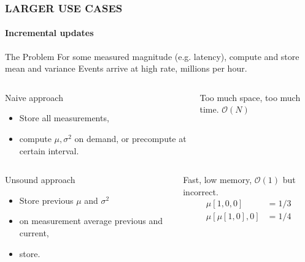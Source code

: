 \documentclass{beamer}
\begin{document}
\begin{frame} \frametitle{LARGER USE CASES}
  \framesubtitle{Incremental updates}
  \begin{block}{The Problem}
    For some measured magnitude (e.g. latency), \alert{compute and store mean and
    variance} Events arrive at high rate, \alert{millions per hour.}
  \end{block} \pause
  \begin{columns}[c]
      \begin{block}{Naive approach}
        \begin{itemize}
        \item Store all measurements,
        \item compute \(\mu, \sigma^2\) on demand, or
          precompute at certain interval.
        \end{itemize}
      \end{block}

  Too much \alert{space}, too much \alert{time}. \(\mathcal{O}(N)\)
  \end{columns}

  \pause

  \begin{columns}[c]
      \begin{block}{Unsound approach}
        \begin{itemize}
        \item Store previous \(\mu\) and \(\sigma^2\)
        \item on measurement average previous and current,
        \item store.
        \end{itemize}
      \end{block}

    Fast, low memory, \(\mathcal{O}(1)\) but \alert{incorrect}.
    \begin{align*}
      \mu[1,0,0] & = 1/3 \\
      \mu[\mu[1,0], 0] &= 1/4
    \end{align*}

  \end{columns}

\end{frame}
\end{document}
